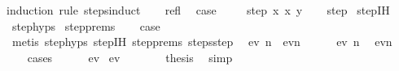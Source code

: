 \begin{isabellebody}
{\isacharparenleft}{\kern0pt}induction\ rule{\isacharcolon}{\kern0pt}\ steps{\isachardot}{\kern0pt}induct{\isacharparenright}{\kern0pt}\isanewline
\ \ \isamarkupfalse%
\ refl\ \isamarkupfalse%
\ {\isacharquery}{\kern0pt}case\ \isacommand{{\isachardot}{\kern0pt}}\isamarkupfalse%
\isanewline
{}\isamarkupfalse%
\isanewline
\ \ \isamarkupfalse%
\ {\isacharparenleft}{\kern0pt}step\ x{\isacharprime}{\kern0pt}\ x\ y{\isacharparenright}{\kern0pt}\isanewline
\ \ \isanewline
{}\isamarkupfalse%
\ step\isanewline
{}\isamarkupfalse%
\ step{\isachardot}{\kern0pt}IH\isanewline
{}\isamarkupfalse%
\ step{\isachardot}{\kern0pt}hyps\isanewline
{}\isamarkupfalse%
\ step{\isachardot}{\kern0pt}prems\isanewline
\ \ \isamarkupfalse%
\ {\isacharquery}{\kern0pt}case\isanewline
\ \ \ \ \isamarkupfalse%
\ {\isacharparenleft}{\kern0pt}metis\ step{\isachardot}{\kern0pt}hyps{\isacharparenleft}{\kern0pt}{}{\isacharparenright}{\kern0pt}\ step{\isachardot}{\kern0pt}IH\ step{\isachardot}{\kern0pt}prems\ steps{\isachardot}{\kern0pt}step{\isacharparenright}{\kern0pt}\isanewline
{}\isamarkupfalse%
%
\endisatagproof
{\isafoldproof}%
%
\isadelimproof
%
\endisadelimproof
%
\isadelimdocument
%
\endisadelimdocument
%
\isatagdocument
%
\isamarkuptrue%
%
\endisatagdocument
{\isafolddocument}%
%
\isadelimdocument
%
\endisadelimdocument
{}\isamarkupfalse%
\ \ {\isachardoublequoteopen}ev\ n{\isachardoublequoteclose}\ \ {\isachardoublequoteopen}ev{\isacharparenleft}{\kern0pt}n\ {\isacharminus}{\kern0pt}\ {}{\isacharparenright}{\kern0pt}{\isachardoublequoteclose}\isanewline
%
\isadelimproof
%
\endisadelimproof
%
\isatagproof
{}\isamarkupfalse%
{\isacharminus}{\kern0pt}\isanewline
\ \ \isamarkupfalse%
\ {\isacharbackquoteopen}ev\ n{\isacharbackquoteclose}\ \isamarkupfalse%
\ {\isachardoublequoteopen}ev{\isacharparenleft}{\kern0pt}n\ {\isacharminus}{\kern0pt}\ {}{\isacharparenright}{\kern0pt}{\isachardoublequoteclose}\isanewline
\ \ \isamarkupfalse%
\ cases\isanewline
\ \ \ \ \isamarkupfalse%
\ ev{}\isanewline
{}\isamarkupfalse%
\ ev{}\isanewline
\ \ \ \ \isamarkupfalse%
\ \isamarkupfalse%
\ {\isacharquery}{\kern0pt}thesis\ \isamarkupfalse%
\ simp\isanewline

\end{isabellebody}
